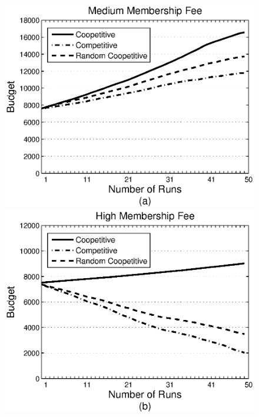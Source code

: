 \documentclass[runningheads,a4paper]{llncs}
\begin{document}

\begin{figure}%
\centering
\includegraphics[scale=0.302]{graphbgtmed3set.eps}
\includegraphics[scale=0.302]{graphbgthigh.eps}

\end{figure}
\end{document}
